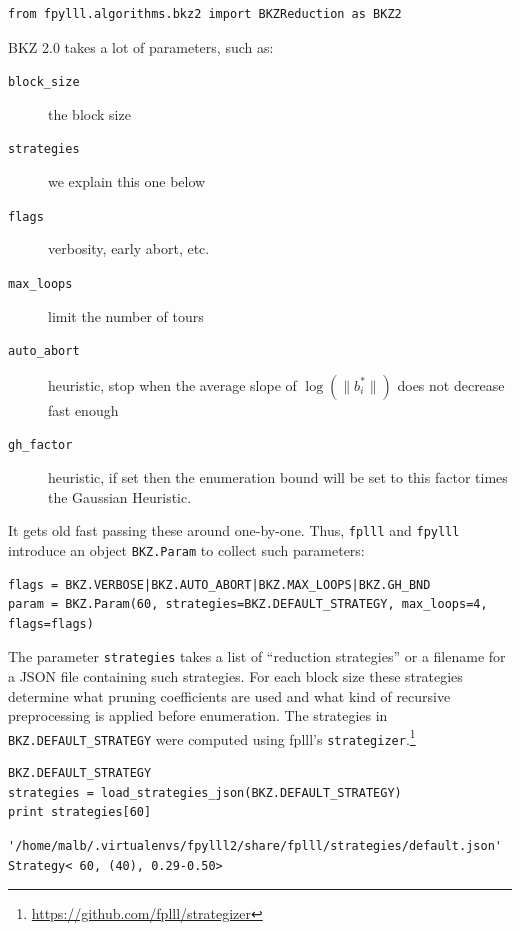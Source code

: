 \documentclass[10pt,a4paper]{tufte-handout}
\begin{document}
\lstset{language=sage,label= ,caption= ,captionpos=b,numbers=none}
\begin{lstlisting}
from fpylll.algorithms.bkz2 import BKZReduction as BKZ2
\end{lstlisting}

BKZ 2.0 takes a lot of parameters, such as:

\begin{description}
\item[{\texttt{block\_size}}] the block size
\item[{\texttt{strategies}}] we explain this one below
\item[{\texttt{flags}}] verbosity, early abort, etc.
\item[{\texttt{max\_loops}}] limit the number of tours
\item[{\texttt{auto\_abort}}] heuristic, stop when the average slope of \(\log(\|b_i^*\|)\) does not decrease fast enough
\item[{\texttt{gh\_factor}}] heuristic, if set then the enumeration bound will be set to this factor times the Gaussian Heuristic.
\end{description}

It gets old fast passing these around one-by-one. Thus, \texttt{fplll} and \texttt{fpylll} introduce an object \texttt{BKZ.Param} to collect such parameters:

\lstset{language=sage,label= ,caption= ,captionpos=b,numbers=none}
\begin{lstlisting}
flags = BKZ.VERBOSE|BKZ.AUTO_ABORT|BKZ.MAX_LOOPS|BKZ.GH_BND
param = BKZ.Param(60, strategies=BKZ.DEFAULT_STRATEGY, max_loops=4, flags=flags)
\end{lstlisting}

The parameter \texttt{strategies} takes a list of “reduction strategies” or a filename for a JSON file containing such strategies. For each block size these strategies determine what pruning coefficients are used and what kind of recursive preprocessing is applied before enumeration. The strategies in \texttt{BKZ.DEFAULT\_STRATEGY} were computed using fplll’s \texttt{strategizer}.\footnote{\url{https://github.com/fplll/strategizer}}

\lstset{language=sage,label= ,caption= ,captionpos=b,numbers=none}
\begin{lstlisting}
BKZ.DEFAULT_STRATEGY
strategies = load_strategies_json(BKZ.DEFAULT_STRATEGY)
print strategies[60]
\end{lstlisting}

\begin{verbatim}
'/home/malb/.virtualenvs/fpylll2/share/fplll/strategies/default.json'
Strategy< 60, (40), 0.29-0.50>
\end{verbatim}
\end{document}
